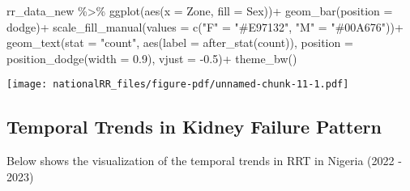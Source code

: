 \documentclass[
  letterpaper,
  DIV=11,
  numbers=noendperiod]{scrartcl}
\newenvironment{Shaded}{\begin{snugshade}}{\end{snugshade}}
\newcommand{\AttributeTok}[1]{\textcolor[rgb]{0.40,0.45,0.13}{#1}}
\newcommand{\FloatTok}[1]{\textcolor[rgb]{0.68,0.00,0.00}{#1}}
\newcommand{\FunctionTok}[1]{\textcolor[rgb]{0.28,0.35,0.67}{#1}}
\newcommand{\NormalTok}[1]{\textcolor[rgb]{0.00,0.23,0.31}{#1}}
\newcommand{\OtherTok}[1]{\textcolor[rgb]{0.00,0.23,0.31}{#1}}
\newcommand{\SpecialCharTok}[1]{\textcolor[rgb]{0.37,0.37,0.37}{#1}}
\newcommand{\StringTok}[1]{\textcolor[rgb]{0.13,0.47,0.30}{#1}}
\begin{document}
\begin{Shaded}
\begin{Highlighting}[]
\NormalTok{rr\_data\_new }\SpecialCharTok{\%\textgreater{}\%} 
  \FunctionTok{ggplot}\NormalTok{(}\FunctionTok{aes}\NormalTok{(}\AttributeTok{x =}\NormalTok{ Zone, }\AttributeTok{fill =}\NormalTok{ Sex))}\SpecialCharTok{+}
  \FunctionTok{geom\_bar}\NormalTok{(}\AttributeTok{position =} \StringTok{\textquotesingle{}dodge\textquotesingle{}}\NormalTok{)}\SpecialCharTok{+}
  \FunctionTok{scale\_fill\_manual}\NormalTok{(}\AttributeTok{values =} \FunctionTok{c}\NormalTok{(}\StringTok{"F"} \OtherTok{=} \StringTok{"\#E97132"}\NormalTok{, }\StringTok{"M"} \OtherTok{=} \StringTok{"\#00A676"}\NormalTok{))}\SpecialCharTok{+}
  \FunctionTok{geom\_text}\NormalTok{(}\AttributeTok{stat =} \StringTok{"count"}\NormalTok{, }\FunctionTok{aes}\NormalTok{(}\AttributeTok{label =} \FunctionTok{after\_stat}\NormalTok{(count)),}
            \AttributeTok{position =} \FunctionTok{position\_dodge}\NormalTok{(}\AttributeTok{width =} \FloatTok{0.9}\NormalTok{),}
            \AttributeTok{vjust =} \SpecialCharTok{{-}}\FloatTok{0.5}\NormalTok{)}\SpecialCharTok{+}
  \FunctionTok{theme\_bw}\NormalTok{()}
\end{Highlighting}
\end{Shaded}

\texttt{[image: nationalRR\_files/figure-pdf/unnamed-chunk-11-1.pdf]}

\subsection{Temporal Trends in Kidney Failure
Pattern}\label{temporal-trends-in-kidney-failure-pattern}

Below shows the visualization of the temporal trends in RRT in Nigeria
(2022 - 2023)
\end{document}
